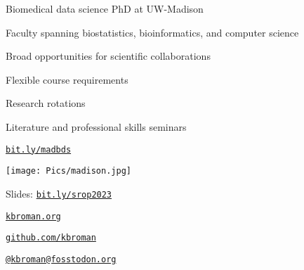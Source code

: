 \documentclass[12pt,t,aspectratio=169]{beamer}
\begin{document}
\begin{frame}{Biomedical data science PhD at UW-Madison}

    \bbi
  \item Faculty spanning biostatistics, bioinformatics, and computer
    science
  \item Broad opportunities for scientific collaborations
  \item Flexible course requirements
  \item Research rotations
  \item Literature and professional skills seminars
    \ei


\bigskip \bigskip

\centerline{\href{https://bit.ly/madbds}{\Large \tt bit.ly/madbds}}

\end{frame}


\begin{frame}[c]{}

  \vspace{-10mm} \hspace*{-13mm}
  \texttt{[image: Pics/madison.jpg]}

\end{frame}



\begin{frame}[c]{}

\Large

Slides: \href{https://bit.ly/srop2023}{\tt bit.ly/srop2023}

\vspace{7mm}

\href{https://kbroman.org}{\tt \lolit kbroman.org}

\vspace{7mm}

\href{https://github.com/kbroman}{\tt \lolit github.com/kbroman}

\vspace{7mm}

\href{https://fosstodon.org/@kbroman}{\tt \lolit @kbroman@fosstodon.org}


\end{frame}
\end{document}
